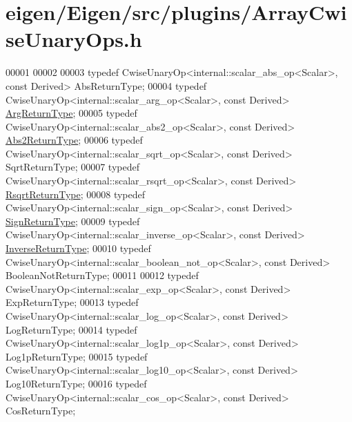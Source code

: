 \hypertarget{eigen_2_eigen_2src_2plugins_2_array_cwise_unary_ops_8h_source}{}\section{eigen/\+Eigen/src/plugins/\+Array\+Cwise\+Unary\+Ops.h}
\label{eigen_2_eigen_2src_2plugins_2_array_cwise_unary_ops_8h_source}

\begin{DoxyCode}
00001 
00002 
00003 \textcolor{keyword}{typedef} CwiseUnaryOp<internal::scalar\_abs\_op<Scalar>, \textcolor{keyword}{const} Derived> AbsReturnType;
00004 \textcolor{keyword}{typedef} CwiseUnaryOp<internal::scalar\_arg\_op<Scalar>, \textcolor{keyword}{const} Derived> 
      \hyperlink{group___core___module_class_eigen_1_1_cwise_unary_op}{ArgReturnType};
00005 \textcolor{keyword}{typedef} CwiseUnaryOp<internal::scalar\_abs2\_op<Scalar>, \textcolor{keyword}{const} Derived> 
      \hyperlink{group___core___module_class_eigen_1_1_cwise_unary_op}{Abs2ReturnType};
00006 \textcolor{keyword}{typedef} CwiseUnaryOp<internal::scalar\_sqrt\_op<Scalar>, \textcolor{keyword}{const} Derived> SqrtReturnType;
00007 \textcolor{keyword}{typedef} CwiseUnaryOp<internal::scalar\_rsqrt\_op<Scalar>, \textcolor{keyword}{const} Derived> 
      \hyperlink{group___core___module_class_eigen_1_1_cwise_unary_op}{RsqrtReturnType};
00008 \textcolor{keyword}{typedef} CwiseUnaryOp<internal::scalar\_sign\_op<Scalar>, \textcolor{keyword}{const} Derived> 
      \hyperlink{group___core___module_class_eigen_1_1_cwise_unary_op}{SignReturnType};
00009 \textcolor{keyword}{typedef} CwiseUnaryOp<internal::scalar\_inverse\_op<Scalar>, \textcolor{keyword}{const} Derived> 
      \hyperlink{group___core___module_class_eigen_1_1_cwise_unary_op}{InverseReturnType};
00010 \textcolor{keyword}{typedef} CwiseUnaryOp<internal::scalar\_boolean\_not\_op<Scalar>, \textcolor{keyword}{const} Derived> BooleanNotReturnType;
00011 
00012 \textcolor{keyword}{typedef} CwiseUnaryOp<internal::scalar\_exp\_op<Scalar>, \textcolor{keyword}{const} Derived> ExpReturnType;
00013 \textcolor{keyword}{typedef} CwiseUnaryOp<internal::scalar\_log\_op<Scalar>, \textcolor{keyword}{const} Derived> LogReturnType;
00014 \textcolor{keyword}{typedef} CwiseUnaryOp<internal::scalar\_log1p\_op<Scalar>, \textcolor{keyword}{const} Derived> Log1pReturnType;
00015 \textcolor{keyword}{typedef} CwiseUnaryOp<internal::scalar\_log10\_op<Scalar>, \textcolor{keyword}{const} Derived> Log10ReturnType;
00016 \textcolor{keyword}{typedef} CwiseUnaryOp<internal::scalar\_cos\_op<Scalar>, \textcolor{keyword}{const} Derived> CosReturnType;

\end{DoxyCode}
